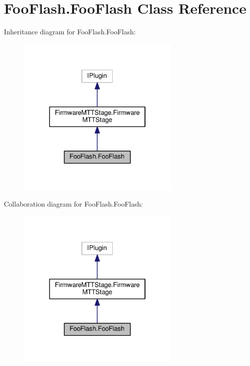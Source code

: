 \hypertarget{class_foo_flash_1_1_foo_flash}{\section{Foo\-Flash.\-Foo\-Flash Class Reference}
\label{class_foo_flash_1_1_foo_flash}
}


Inheritance diagram for Foo\-Flash.\-Foo\-Flash\-:
\nopagebreak
\begin{figure}[H]
\begin{center}
\leavevmode
\includegraphics[width=226pt]{class_foo_flash_1_1_foo_flash__inherit__graph}
\end{center}
\end{figure}


Collaboration diagram for Foo\-Flash.\-Foo\-Flash\-:
\nopagebreak
\begin{figure}[H]
\begin{center}
\leavevmode
\includegraphics[width=226pt]{class_foo_flash_1_1_foo_flash__coll__graph}
\end{center}
\end{figure}
